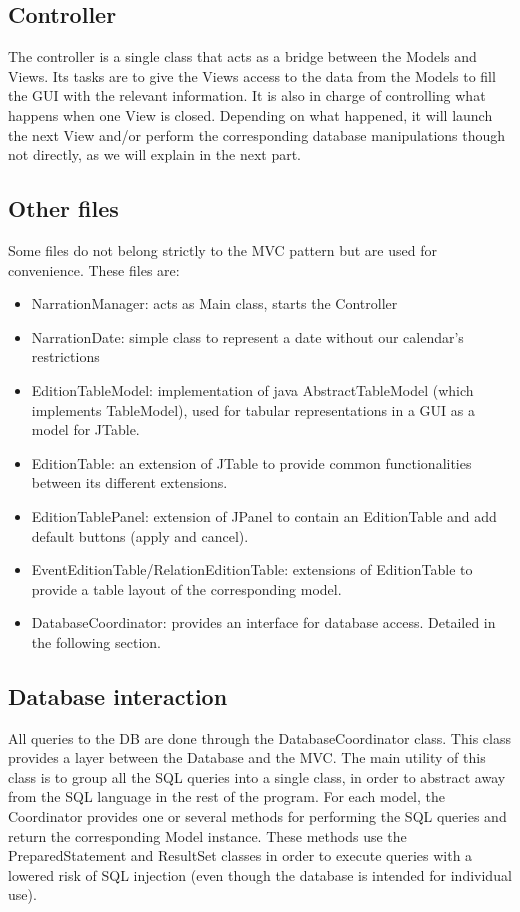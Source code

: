 \documentclass[a4paper ,12pt,french]{article}
\begin{document}
\subsection{Controller}
The controller is a single class that acts as a bridge between the Models and Views. Its tasks are to give the Views access to the data from the Models to fill the GUI with the relevant information. It is also in charge of controlling what happens when one View is closed. Depending on what happened, it will launch the next View and/or perform the corresponding database manipulations though not directly, as we will explain in the next part.

\subsection{Other files}
Some files do not belong strictly to the MVC pattern but are used for convenience.
These files are:
\begin{itemize}
\item NarrationManager: acts as Main class, starts the Controller
\item NarrationDate: simple class to represent a date without our calendar's restrictions
\item EditionTableModel: implementation of java AbstractTableModel (which implements TableModel), used for tabular representations in a GUI as a model for JTable.
\item EditionTable: an extension of JTable to provide common functionalities between its different extensions.
\item EditionTablePanel: extension of JPanel to contain an EditionTable and add default buttons (apply and cancel).
\item EventEditionTable/RelationEditionTable: extensions of EditionTable to provide a table layout of the corresponding model.
\item DatabaseCoordinator: provides an interface for database access. Detailed in the following section.
\end{itemize}

\subsection{Database interaction}
All queries to the DB are done through the DatabaseCoordinator class. This class provides a layer between the Database and the MVC. The main utility of this class is to group all the SQL queries into a single class, in order to abstract away from the SQL language in the rest of the program. For each model, the Coordinator provides one or several methods for performing the SQL queries and return the corresponding Model instance. These methods use the PreparedStatement and ResultSet classes in order to execute queries with a lowered risk of SQL injection (even though the database is intended for individual use).\\ \\
\end{document}
